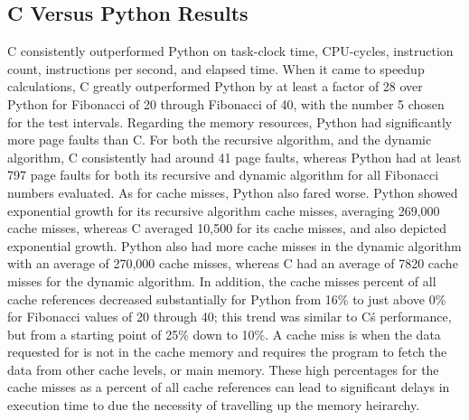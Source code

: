 \documentclass{sig-alternate}
\begin{document}
\subsection{C Versus Python Results}
C consistently outperformed Python on task-clock time, CPU-cycles, instruction count, instructions per second, and elapsed time. When it came to speedup calculations, C greatly outperformed Python by at least a factor of 28 over Python for Fibonacci of 20 through Fibonacci of 40, with the number 5 chosen for the test intervals. Regarding the memory resources, Python had significantly more page faults than C. For both the recursive algorithm, and the dynamic algorithm, C consistently had around 41 page faults, whereas Python had at least 797 page faults for both its recursive and dynamic algorithm for all Fibonacci numbers evaluated. As for cache misses, Python also fared worse. Python showed exponential growth for its recursive algorithm cache misses, averaging 269,000 cache misses, whereas C averaged 10,500 for its cache misses, and also depicted exponential growth. Python also had more cache misses in the dynamic algorithm with an average of 270,000 cache misses, whereas C had an average of 7820 cache misses for the dynamic algorithm. In addition, the cache misses percent of all cache references decreased substantially for Python from 16\% to just above 0\% for Fibonacci values of 20 through 40; this trend was similar to C\'s performance, but from a starting point of 25\% down to 10\%. A cache miss is when the data requested for is not in the cache memory and requires the program to fetch the data from other cache levels, or main memory. These high percentages for the cache misses as a percent of all cache references can lead to significant delays in execution time to due the necessity of travelling up the memory heirarchy.
\end{document}
